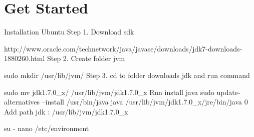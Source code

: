 \chapter{Get Started}

Installation
Ubuntu
Step 1. Download sdk

http://www.oracle.com/technetwork/java/javase/downloads/jdk7-downloads-1880260.html
Step 2. Create folder jvm

sudo mkdir /usr/lib/jvm/
Step 3. cd to folder downloads jdk and run command

sudo mv jdk1.7.0_x/ /usr/lib/jvm/jdk1.7.0_x
Run install java
sudo update-alternatives --install /usr/bin/java java /usr/lib/jvm/jdk1.7.0_x/jre/bin/java 0
Add path jdk : /usr/lib/jvm/jdk1.7.0_x

su -
nano /etc/environment